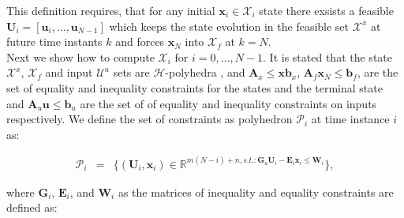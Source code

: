     This definition requires, that for any initial $\textbf{x}_i\in\mathcal{X}_i$ state there exsists a feasible $\textbf{U}_i=[\textbf{u}_i,\dots,\textbf{u}_{N-1}]$ which keeps the state evolution in the feasible set $\mathcal{X}^x$ at future time instants $k$ and forces $\textbf{x}_N$ into $\mathcal{X}_f$ at $k=N$.\\
    Next we show how to compute $\mathcal{X}_i$ for $i=0,\dots,N-1$. It is stated that the state $\mathcal{X}^x$, $\mathcal{X}_f$ and input $\mathcal{U}^u$ sets are $\mathcal{H}$-polyhedra \cite{borrelli2017predictive}, and $\textbf{A}_x\leq\textbf{x}\textbf{b}_x$, $\textbf{A}_f\textbf{x}_N\leq \textbf{b}_f$, are the set of equality and inequality constraints for the states and the terminal state and $\textbf{A}_u\textbf{u}\leq \textbf{b}_u$ are the set of of equality and inequality constraints on inputs respectively. We define the set of constraints as polyhedron $\mathcal{P}_i$ at time instance $i$ as:

    \begin{equation}
        \begin{array}{rcl}
            \mathcal{P}_i&=&\{
            (\textbf{U}_i,\textbf{x}_i)\in\mathbb{R}^{m(N-i)+n,s.t.:\textbf{G}_u\textbf{U}_i-\textbf{E}_i\textbf{x}_i\leq\textbf{W}_i}
            \},
        \end{array}
        \label{BASICMPC:equ:constrained_constraint_set}
    \end{equation}

    where $\textbf{G}_i$, $\textbf{E}_i$, and $\textbf{W}_i$ as the matrices of inequality and equality constraints are defined as:

